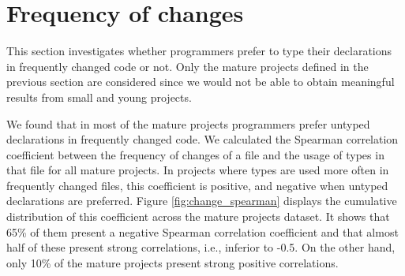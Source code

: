 \documentclass[msc]{ppgccufmg}
\begin{document}
% 


\section{Frequency of changes\label{sec:results-changes}}
This section investigates whether programmers prefer to type their declarations in frequently changed code or not.
Only the mature projects defined in the previous section are considered since we would not be able to obtain meaningful results from small and young projects.

We found that in most of the mature projects programmers prefer untyped declarations in frequently changed code.
We calculated the Spearman correlation coefficient between the frequency of changes of a file and the usage of types in that file for all mature projects.
In projects where types are used more often in frequently changed files, this coefficient is positive, and negative when untyped declarations are preferred.
Figure \ref{fig:change_spearman} displays the cumulative distribution of this coefficient across the mature projects dataset.
It shows that 65\% of them present a negative Spearman correlation coefficient and that almost half of these present strong correlations, i.e., inferior to -0.5.
On the other hand, only 10\% of the mature projects present strong positive correlations.
\end{document}
